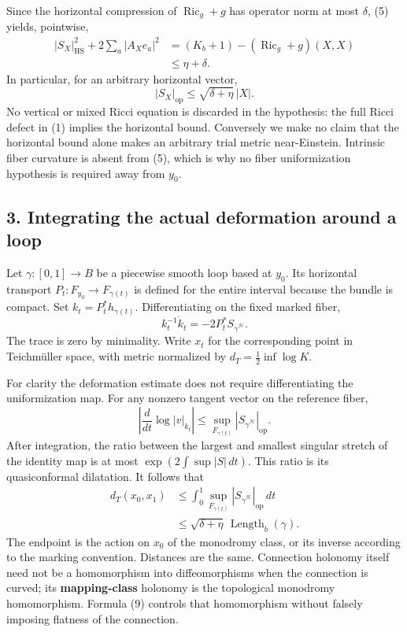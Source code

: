 \documentclass[
  11pt,
]{article}
\begin{document}
Since the horizontal compression of \(\operatorname{Ric}_g+g\) has
operator norm at most \(\delta\), (5) yields, pointwise, \[
\begin{split}
 |S_X|_{\mathrm{HS}}^2+2\sum_a|A_Xe_a|^2
   &=(K_b+1)-(\operatorname{Ric}_g+g)(X,X)\\
   &\le\eta+\delta.
\end{split}                                                \tag{6}
\] In particular, for an arbitrary horizontal vector, \[
                 |S_X|_{\mathrm{op}}
           \le\sqrt{\delta+\eta}\,|X|.                    \tag{7}
\] No vertical or mixed Ricci equation is discarded in the hypothesis:
the full Ricci defect in (1) implies the horizontal bound. Conversely we
make no claim that the horizontal bound alone makes an arbitrary trial
metric near-Einstein. Intrinsic fiber curvature is absent from (5),
which is why no fiber uniformization hypothesis is required away from
\(y_0\).

\hypertarget{integrating-the-actual-deformation-around-a-loop}{%
\subsection{3. Integrating the actual deformation around a
loop}\label{integrating-the-actual-deformation-around-a-loop}}

Let \(\gamma:[0,1]\to B\) be a piecewise smooth loop based at \(y_0\).
Its horizontal transport \(P_t:F_{y_0}\to F_{\gamma(t)}\) is defined for
the entire interval because the bundle is compact. Set
\(k_t=P_t^*h_{\gamma(t)}\). Differentiating on the fixed marked fiber,
\[
                 k_t^{-1}\dot k_t=-2P_t^*S_{\dot\gamma^{\mathcal H}}.
                                                                  \tag{8}
\] The trace is zero by minimality. Write \(x_t\) for the corresponding
point in Teichmüller space, with metric normalized by
\(d_T=\tfrac12\inf\log K\).

For clarity the deformation estimate does not require differentiating
the uniformization map. For any nonzero tangent vector on the reference
fiber, \[
 \left|\frac{d}{dt}\log |v|_{k_t}\right|
       \le\sup_{F_{\gamma(t)}}|S_{\dot\gamma^{\mathcal H}}|_{\mathrm{op}}.
\] After integration, the ratio between the largest and smallest
singular stretch of the identity map is at most
\(\exp(2\int\sup|S|\,dt)\). This ratio is its quasiconformal dilatation.
It follows that \[
\begin{split}
 d_T(x_0,x_1)
 &\le\int_0^1\sup_{F_{\gamma(t)}}
            |S_{\dot\gamma^{\mathcal H}}|_{\mathrm{op}}\,dt\\
 &\le\sqrt{\delta+\eta}\,\operatorname{Length}_b(\gamma).
\end{split}                                                     \tag{9}
\] The endpoint is the action on \(x_0\) of the monodromy class, or its
inverse according to the marking convention. Distances are the same.
Connection holonomy itself need not be a homomorphism into
diffeomorphisms when the connection is curved; its
\textbf{mapping-class} holonomy is the topological monodromy
homomorphism. Formula (9) controls that homomorphism without falsely
imposing flatness of the connection.
\end{document}
